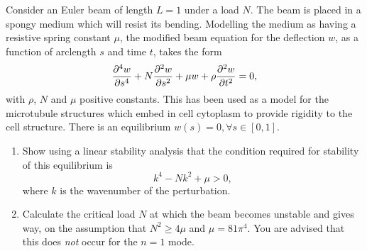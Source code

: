 \documentclass[a4paper, 12pt]{article}
\begin{document}
\begin{enumerate}[label={\bf \arabic{*}.\;}, ref={\arabic{*}},itemsep=3ex, left=0ex]
{    }


    {
      Consider an Euler beam of length $L=1$ under a load $N$. The beam is placed in a spongy medium which will resist its bending. Modelling the medium as having a resistive spring constant $\mu$, the modified beam equation for the deflection $w$, as a function of arclength $s$ and time $t$, takes the form
      \begin{equation}
        \label{beameq}
        \pdn{4}{w}{s} + N\pdd{w}{s} +\mu w +\rho \pdd{w}{t}=0,
      \end{equation}
      with $\rho$, $N$ and $\mu$ positive constants.
      This has been used as a model for the microtubule structures which embed in cell cytoplasm to provide rigidity to the cell structure. There is an equilibrium $w(s)=0,\forall s\in[0,1]$.
      \begin{enumerate}[label=(\alph*)]
        \item Show using a linear stability analysis that the condition required for stability of this equilibrium is
          \begin{equation}
            k^4 -N k^2+\mu >0,
          \end{equation}
          where $k$ is the wavenumber of the perturbation.

        \item Calculate the critical load $N$ at which the beam becomes unstable and gives way, on the assumption that $N^2\geq 4\mu$ and $\mu=81\pi^4$. You are advised that this does \emph{not} occur for the $n=1$ mode.


\end{enumerate}}
\end{enumerate}
\end{document}
